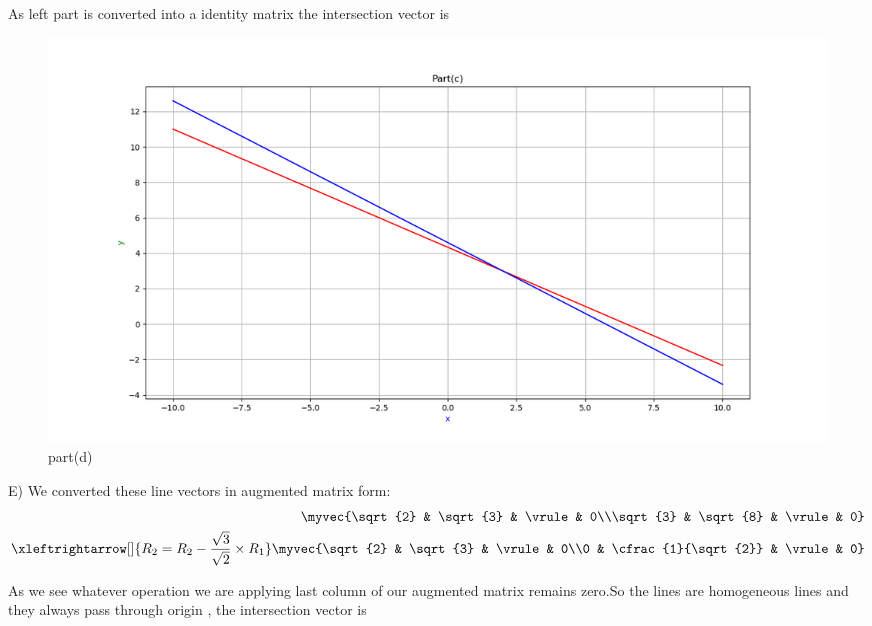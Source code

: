 \begin{enumerate}[label=\thesection.\arabic*.,ref=\thesection.\theenumi]
As left part is converted into a identity matrix the intersection vector is \\

\renewcommand{\thefigure}{\theenumi.\arabic{figure}}
\begin{figure}[!ht]
    \centering
    \includegraphics[width=\columnwidth]{./figures/A1_partd}
\caption{part(d)}
\label{fig: part(d)}
\end{figure}

E)
We converted these line vectors in augmented matrix form:\\ 

\begin{align*}
    \myvec{\sqrt{2} & \sqrt{3} & \vrule & 0\\\sqrt{3} & \sqrt{8} & \vrule & 0}
\\
    \xleftrightarrow[]{R_{2}=R_{2}-\frac{\sqrt{3}}{\sqrt{2}}\times R_{1}} \myvec{\sqrt{2} & \sqrt{3} & \vrule & 0\\0 & \cfrac{1}{\sqrt{2}} & \vrule & 0}
\end{align*}

As we see whatever operation we are applying last column of our augmented matrix remains zero.So the lines are homogeneous lines and they always pass through  origin , the intersection vector is \\


\end{enumerate}
